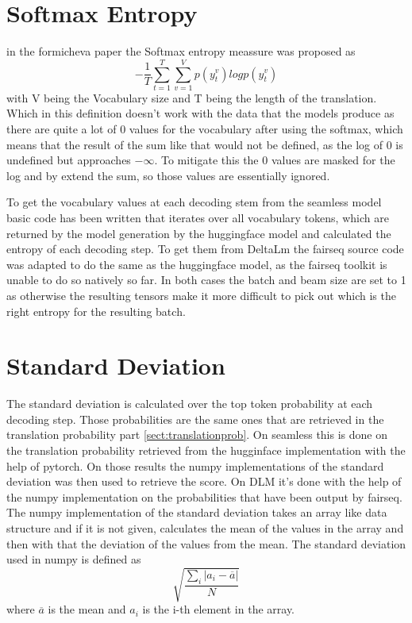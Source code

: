 \section{Softmax Entropy}
in the formicheva \cite{fomicheva2020unsupervised} paper the Softmax entropy meassure was proposed as $$-\frac{1}{T}\sum_{t=1}^T\sum_{v=1}^Vp(y_t^v)logp(y_t^v)$$ with V being the Vocabulary size and T being the length of the translation. Which in this definition doesn't work with the data that the models produce as there are quite a lot of 0 values for the vocabulary after using the softmax, which means that the result of the sum like that would not be defined, as the log of 0 is undefined but approaches $-\infty$. To mitigate this the 0 values are masked for the log and by extend the sum, so those values are essentially ignored. 

To get the vocabulary values at each decoding stem from the seamless model basic code has been written that iterates over all vocabulary tokens, which are returned by the model generation by the huggingface model and calculated the entropy of each decoding step.
To get them from DeltaLm the fairseq source code was adapted to do the same as the huggingface model, as the fairseq toolkit is unable to do so natively so far. 
In both cases the batch and beam size are set to 1 as otherwise the resulting tensors make it more difficult to pick out which is the right entropy for the resulting batch. 

\section{Standard Deviation}
The standard deviation is calculated over the top token probability at each decoding step. 
Those probabilities are the same ones that are retrieved in the translation probability part \autoref{sect:translationprob}.
On seamless this is done on the translation probability retrieved from the hugginface implementation with the help of pytorch. 
On those results the numpy implementations of the standard deviation\cite{numpystddiv} was then used to retrieve the score.
On DLM it's done with the help of the numpy implementation on the probabilities that have been output by fairseq. 
The numpy implementation of the standard deviation takes an array like data structure and if it is not given, calculates the mean of the values in the array and then with that the deviation of the values from the mean. 
The standard deviation used in numpy is defined as $$\sqrt{\frac{\sum_i |a_i-\overline{a}|}{N}}$$ where $\overline{a}$ is the mean and $a_i$ is the i-th element in the array.


